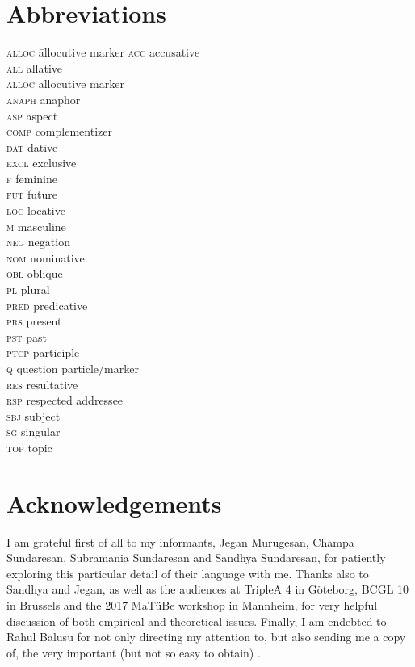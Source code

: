 \documentclass[output=paper, modfonts, nonflat]{langsci/langscibook}
\begin{document}
\pagebreak
\section*{Abbreviations}
\begin{multicols}{2}
	\begin{tabbing}
\textsc{alloc}\hspace{5mm} \= allocutive marker\kill
	\textsc{acc} \> accusative\\
		\textsc{all} \> allative\\
  \textsc{alloc} \> allocutive marker\\
  \textsc{anaph} \> anaphor\\
  \textsc{asp} \> aspect\\
  	\textsc{comp} \> complementizer\\
  \textsc{dat} \> dative\\
  \textsc{excl} \> exclusive\\
  	\textsc{f} \> feminine\\
  	\textsc{fut} \> future\\
  	\textsc{loc} \> locative\\
  		\textsc{m} \> masculine\\
  		\textsc{neg} \> negation\\
  			\textsc{nom} \> nominative\\
  			\textsc{obl} \> oblique\\
  			\textsc{pl} \> plural\\
  			\textsc{pred} \> predicative\\
  			\textsc{prs} \> present\\
  \textsc{pst} \> past\\
  \textsc{ptcp} \> participle\\
  \textsc{q} \> question particle/marker\\
  \textsc{res} \> resultative\\
  \textsc{rsp} \> respected addressee\\
  	\textsc{sbj} \> subject\\
  		\textsc{sg} \> singular\\
  			\textsc{top} \> topic\\
	\end{tabbing} 
\end{multicols}

\section*{Acknowledgements}

I am grateful first of all to my informants, Jegan Murugesan, Champa
Sundaresan, Subramania Sundaresan and Sandhya Sundaresan, for
patiently exploring this particular detail of their language with
me. Thanks also to Sandhya and Jegan, as well as the audiences at
TripleA 4 in Göteborg, BCGL 10 in Brussels and the 2017 MaTüBe
workshop in Mannheim, for very helpful discussion of both empirical
and theoretical issues. Finally, I am endebted to Rahul Balusu for not
only directing my attention to, but also sending me a copy of, the
very important (but not so easy to obtain) \citet{amrit:1991}.

{\sloppy\printbibliography[heading=subbibliography,notkeyword=this]}
\end{document}
